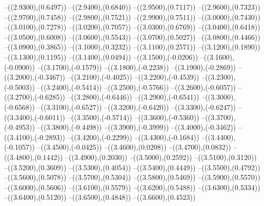 {	--({\sx*(2.9300)},{\sy*(0.6497)})
	--({\sx*(2.9400)},{\sy*(0.6840)})
	--({\sx*(2.9500)},{\sy*(0.7117)})
	--({\sx*(2.9600)},{\sy*(0.7323)})
	--({\sx*(2.9700)},{\sy*(0.7458)})
	--({\sx*(2.9800)},{\sy*(0.7521)})
	--({\sx*(2.9900)},{\sy*(0.7511)})
	--({\sx*(3.0000)},{\sy*(0.7430)})
	--({\sx*(3.0100)},{\sy*(0.7278)})
	--({\sx*(3.0200)},{\sy*(0.7057)})
	--({\sx*(3.0300)},{\sy*(0.6769)})
	--({\sx*(3.0400)},{\sy*(0.6418)})
	--({\sx*(3.0500)},{\sy*(0.6008)})
	--({\sx*(3.0600)},{\sy*(0.5543)})
	--({\sx*(3.0700)},{\sy*(0.5027)})
	--({\sx*(3.0800)},{\sy*(0.4466)})
	--({\sx*(3.0900)},{\sy*(0.3865)})
	--({\sx*(3.1000)},{\sy*(0.3232)})
	--({\sx*(3.1100)},{\sy*(0.2571)})
	--({\sx*(3.1200)},{\sy*(0.1890)})
	--({\sx*(3.1300)},{\sy*(0.1195)})
	--({\sx*(3.1400)},{\sy*(0.0494)})
	--({\sx*(3.1500)},{\sy*(-0.0206)})
	--({\sx*(3.1600)},{\sy*(-0.0900)})
	--({\sx*(3.1700)},{\sy*(-0.1579)})
	--({\sx*(3.1800)},{\sy*(-0.2238)})
	--({\sx*(3.1900)},{\sy*(-0.2869)})
	--({\sx*(3.2000)},{\sy*(-0.3467)})
	--({\sx*(3.2100)},{\sy*(-0.4025)})
	--({\sx*(3.2200)},{\sy*(-0.4539)})
	--({\sx*(3.2300)},{\sy*(-0.5003)})
	--({\sx*(3.2400)},{\sy*(-0.5414)})
	--({\sx*(3.2500)},{\sy*(-0.5766)})
	--({\sx*(3.2600)},{\sy*(-0.6057)})
	--({\sx*(3.2700)},{\sy*(-0.6285)})
	--({\sx*(3.2800)},{\sy*(-0.6446)})
	--({\sx*(3.2900)},{\sy*(-0.6541)})
	--({\sx*(3.3000)},{\sy*(-0.6568)})
	--({\sx*(3.3100)},{\sy*(-0.6527)})
	--({\sx*(3.3200)},{\sy*(-0.6420)})
	--({\sx*(3.3300)},{\sy*(-0.6247)})
	--({\sx*(3.3400)},{\sy*(-0.6011)})
	--({\sx*(3.3500)},{\sy*(-0.5714)})
	--({\sx*(3.3600)},{\sy*(-0.5360)})
	--({\sx*(3.3700)},{\sy*(-0.4953)})
	--({\sx*(3.3800)},{\sy*(-0.4498)})
	--({\sx*(3.3900)},{\sy*(-0.3999)})
	--({\sx*(3.4000)},{\sy*(-0.3462)})
	--({\sx*(3.4100)},{\sy*(-0.2893)})
	--({\sx*(3.4200)},{\sy*(-0.2299)})
	--({\sx*(3.4300)},{\sy*(-0.1684)})
	--({\sx*(3.4400)},{\sy*(-0.1057)})
	--({\sx*(3.4500)},{\sy*(-0.0425)})
	--({\sx*(3.4600)},{\sy*(0.0208)})
	--({\sx*(3.4700)},{\sy*(0.0832)})
	--({\sx*(3.4800)},{\sy*(0.1442)})
	--({\sx*(3.4900)},{\sy*(0.2030)})
	--({\sx*(3.5000)},{\sy*(0.2592)})
	--({\sx*(3.5100)},{\sy*(0.3120)})
	--({\sx*(3.5200)},{\sy*(0.3609)})
	--({\sx*(3.5300)},{\sy*(0.4054)})
	--({\sx*(3.5400)},{\sy*(0.4449)})
	--({\sx*(3.5500)},{\sy*(0.4792)})
	--({\sx*(3.5600)},{\sy*(0.5078)})
	--({\sx*(3.5700)},{\sy*(0.5304)})
	--({\sx*(3.5800)},{\sy*(0.5469)})
	--({\sx*(3.5900)},{\sy*(0.5570)})
	--({\sx*(3.6000)},{\sy*(0.5606)})
	--({\sx*(3.6100)},{\sy*(0.5579)})
	--({\sx*(3.6200)},{\sy*(0.5488)})
	--({\sx*(3.6300)},{\sy*(0.5334)})
	--({\sx*(3.6400)},{\sy*(0.5120)})
	--({\sx*(3.6500)},{\sy*(0.4848)})
	--({\sx*(3.6600)},{\sy*(0.4523)})
}
